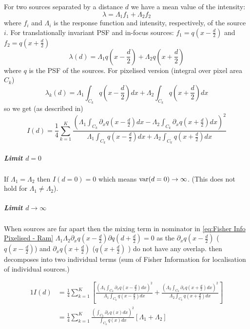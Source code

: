 For two sources separated by a distance $d$ we have a mean value of the intensity:
%
\begin{equation}
	\lambda=\Lambda_1f_1+\Lambda_2f_2
\end{equation}
%
where $f_i$ and $\Lambda_i$ is the response function and intensity, respectively, of the source $i$. For translationally invariant PSF
and in-focus sources: $f_1=q(x-\frac{d}{2})$ and $f_2=q(x+\frac{d}{2})$
%
\begin{equation}
	\lambda(d)=\Lambda_1q(x-\frac{d}{2})+\Lambda_2q(x+\frac{d}{2})
\end{equation}
%
where $q$ is the PSF of the sources. For pixelised version (integral over pixel area $C_k$)
%
\begin{equation}
	\lambda_k(d)=\Lambda_1\int_{C_k}q(x-\frac{d}{2})dx+\Lambda_2\int_{C_k}q(x+\frac{d}{2})dx
\end{equation}
%
so we get (as described in\citet{Ram2006})
%
\begin{equation}
	I(d)=\frac{1}{4}\sum_{k=1}^K\frac{\left(\Lambda_1\int_{C_k}\partial_{x}q(x-\frac{d}{2})dx-\Lambda_2\int_{C_k}\partial_{x}q(x+\frac{d}{2})dx\right)^2}{\Lambda_1\int_{C_k}q(x-\frac{d}{2})dx+\Lambda_2\int_{C_k}q(x+\frac{d}{2})dx}
	\label{eq:Fisher Info Pixelised - Ram}
\end{equation}

\subparagraph*{Limit $d=0$}

If $\Lambda_1=\Lambda_2$ then $I(d=0)=0$ which means $\mathrm{var}(d=0)\rightarrow\infty$. (This does not hold for $\Lambda_1\neq\Lambda_2$). 

\noindent
\subparagraph*{Limit $d\rightarrow\infty$}

When sources are far apart then the mixing term in nominator in \autoref{eq:Fisher Info Pixelised - Ram} $\Lambda_1\Lambda_2\partial_{x}q(x-\frac{d}{2})\partial q(d+\frac{d}{2})=0$ as the $\partial_{x}q(x-\frac{d}{2})$ ($q(x-\frac{d}{2})$) and $\partial_{x}q(x+\frac{d}{2})$ ($q(x+\frac{d}{2})$ ) do not have any overlap.  then decomposes into two individual terms (sum of Fisher Information for localisation of individual sources.)

\begin{alignat*}{1}
	I(d) 
	& =\frac{1}{4}\sum_{k=1}^K\left[\frac{\left(\Lambda_1\int_{C_k}\partial_{x}q(x-\frac{d}{2})dx\right)^2}{\Lambda_1\int_{C_k}q(x-\frac{d}{2})dx}+\frac{\left(\Lambda_2\int_{C_k}\partial_{x}q(x+\frac{d}{2})dx\right)^2}{\Lambda_2\int_{C_k}q(x+\frac{d}{2})dx}\right]\\
	& =\frac{1}{4}\sum_{k=1}^K\frac{\left(\int_{C_k}\partial_{x}q(x)dx\right)^2}{\int_{C_k}q(x)dx}\left[\Lambda_1+\Lambda_2\right]
\end{alignat*}

